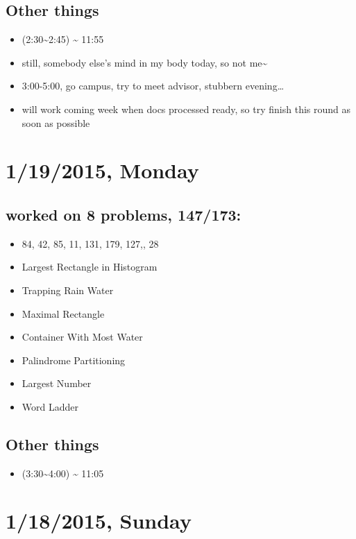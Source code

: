 \documentclass[9pt,b5paper]{article}
\begin{document}
\subsection{Other things}
\label{sec-4-2}
\begin{itemize}
\item (2:30\textasciitilde{}2:45) \textasciitilde{} 11:55
\item still, somebody else's mind in my body today, so not me\textasciitilde{}
\item 3:00-5:00, go campus, try to meet advisor, stubbern evening\ldots{}
\item will work coming week when docs processed ready, so try finish this round as soon as possible
\end{itemize}
\section{1/19/2015, Monday}
\label{sec-5}
\subsection{worked on 8 problems, 147/173:}
\label{sec-5-1}
\begin{itemize}
\item 84, 42, 85, 11, 131, 179, 127,, 28
\item Largest Rectangle in Histogram
\item Trapping Rain Water
\item Maximal Rectangle
\item Container With Most Water
\item Palindrome Partitioning
\item Largest Number
\item Word Ladder
\end{itemize}
\subsection{Other things}
\label{sec-5-2}
\begin{itemize}
\item (3:30\textasciitilde{}4:00) \textasciitilde{} 11:05
\end{itemize}
\section{1/18/2015, Sunday}
\label{sec-6}
\end{document}
